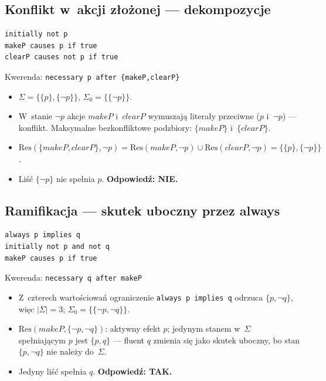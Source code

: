 \documentclass[11pt,a4paper]{article}
\newcommand{\Res}{\mathrm{Res}}
\begin{document}
\subsection{Konflikt w~akcji złożonej --- dekompozycje}

\begin{verbatim}
initially not p
makeP causes p if true
clearP causes not p if true
\end{verbatim}
Kwerenda: \texttt{necessary p after \{makeP,clearP\}}

\begin{itemize}
  \item $\Sigma = \{\{p\},\{\lnot p\}\}$, $\Sigma_0 = \{\{\lnot p\}\}$.
  \item W~stanie $\lnot p$ akcje $\mathit{makeP}$ i~$\mathit{clearP}$ wymuszają
        literały przeciwne ($p$ i~$\lnot p$) --- konflikt. Maksymalne
        bezkonfliktowe podzbiory: $\{\mathit{makeP}\}$ i~$\{\mathit{clearP}\}$.
  \item $\Res(\{\mathit{makeP},\mathit{clearP}\}, \lnot p)
        = \Res(\mathit{makeP},\lnot p) \cup \Res(\mathit{clearP},\lnot p)
        = \{\{p\},\{\lnot p\}\}$.
  \item Liść $\{\lnot p\}$ nie spełnia $p$. \textbf{Odpowiedź: NIE.}
\end{itemize}

\subsection{Ramifikacja --- skutek uboczny przez \textbf{always}}

\begin{verbatim}
always p implies q
initially not p and not q
makeP causes p if true
\end{verbatim}
Kwerenda: \texttt{necessary q after makeP}

\begin{itemize}
  \item Z~czterech wartościowań ograniczenie \texttt{always p implies q} odrzuca
        $\{p,\lnot q\}$, więc $|\Sigma| = 3$;
        $\Sigma_0 = \{\{\lnot p,\lnot q\}\}$.
  \item $\Res(\mathit{makeP}, \{\lnot p,\lnot q\})$: aktywny efekt $p$; jedynym
        stanem w~$\Sigma$ spełniającym $p$ jest $\{p,q\}$ --- fluent $q$
        zmienia się jako skutek uboczny, bo stan $\{p,\lnot q\}$ nie należy
        do~$\Sigma$.
  \item Jedyny liść spełnia $q$. \textbf{Odpowiedź: TAK.}
\end{itemize}
\end{document}
